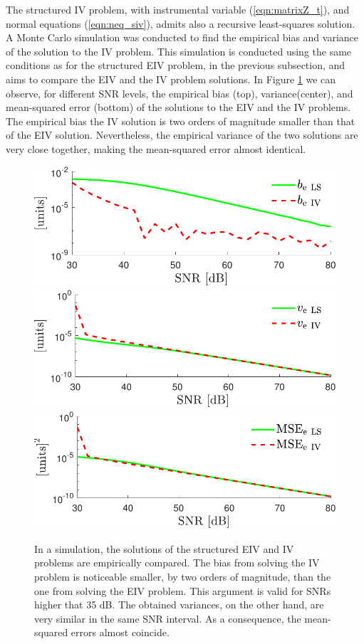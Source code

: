 The structured IV problem, with instrumental variable (\ref{eqn:matrixZ_t}), and normal equations (\ref{eqn:neq_siv}), admits also a recursive least-squares solution. 
A Monte Carlo simulation was conducted to find the empirical bias and variance of the solution to the IV problem.
This simulation is conducted using the same conditions as for the structured EIV problem, in the previous subsection, and aims to compare the EIV and the IV problem solutions.   
In Figure \ref{fig:bvMSE_IV} we can observe, for different SNR levels, the empirical bias (top), variance(center), and mean-squared error (bottom) of the solutions to the EIV and the IV problems.
The empirical bias the IV solution is two orders of magnitude smaller than that of the EIV solution. 
Nevertheless, the empirical variance of the two solutions are very close together, making the mean-squared error almost identical.
 

\begin{figure}[!htpb]
  \centering
  \includegraphics[width=0.69\columnwidth]{./ChapterStatisticalAnalysis/fig/Fig_14.pdf}
  \includegraphics[width=0.69\columnwidth]{./ChapterStatisticalAnalysis/fig/Fig_15.pdf}
  \includegraphics[width=0.69\columnwidth]{./ChapterStatisticalAnalysis/fig/Fig_16.pdf}
  \caption{\label{fig:bvMSE_IV} \color{blue} In a simulation, the solutions of the structured EIV and IV problems are empirically compared. The bias from solving the IV problem is noticeable smaller, by two orders of magnitude, than the one from solving the EIV problem. This argument is valid for SNRs higher that 35 dB. The obtained variances, on the other hand, are very similar in the same SNR interval. As a consequence, the mean-squared errors almost coincide.}
\end{figure}


